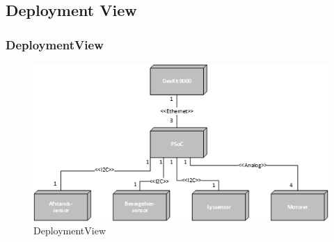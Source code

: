 \subsection{Deployment View}
\subsubsection{DeploymentView}
\begin{figure}[H] \centering
    \includegraphics[width=\textwidth]{0_Filer/Figuer/DeploymentView.png}
    \caption{DeploymentView}
    \label{fig:DeploymentView}
\end{figure}
